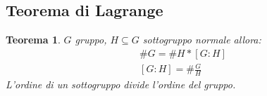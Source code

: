 \documentclass{article}
\newtheorem{theorem}{Teorema}[section]
\theoremstyle{definition}
\begin{document}
\subsection{Teorema di Lagrange}
\begin{tcolorbox}
\begin{theorem}
       $ G $ gruppo, $ H \subseteq G $ sottogruppo normale allora:
       \begin{align*}
               \#G = \# H * [G : H] \\
               [G : H] = \# \frac{G}{H} 
       \end{align*}
       L'ordine di un sottogruppo divide l'ordine del gruppo.
\end{theorem}
\end{tcolorbox}
\end{document}
